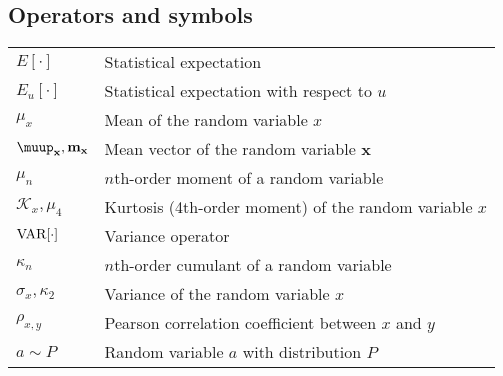 \documentclass{article}
\begin{document}
\subsection{Operators and symbols}
\begin{xltabular}{\textwidth}{XX}
    \(E\left[ \cdot \right]\) & Statistical expectation\\
    \(E_u\left[ \cdot \right]\) & Statistical expectation with respect to \(u\)\\
    \(\mu_x\) & Mean of the random variable \(x\) \\
    \(\boldsymbol{\muup}_\mathbf{x}, \mathbf{m}_\mathbf{x}\) & Mean vector of the random variable \(\mathbf{x}\)\\
    \(\mu_n\) & \(n\)th-order moment of a random variable \\
    \(\mathcal{K}_x, \mu_4\) & Kurtosis (4th-order moment) of the random variable \(x\)\\
    \(\textnormal{VAR}[\cdot]\) & Variance operator\\
    \(\kappa_n\) & \(n\)th-order cumulant of a random variable \\
    \(\sigma_x, \kappa_2\) & Variance of the random variable \(x\)\\
    \(\rho_{x,y}\) & Pearson correlation coefficient between \(x\) and \(y\)\\
    \(a\sim P\) & Random variable \(a\) with distribution \(P\) \\
\end{xltabular}
\end{document}
